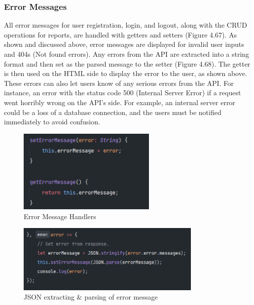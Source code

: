\subsubsection{Error Messages}
All error messages for user registration, login, and logout, along with the CRUD operations for reports, are handled with getters and setters (Figure 4.67). As shown and discussed above, error messages are displayed for invalid user inputs and 404s (Not found errors). Any errors from the API are extracted into a string format and then set as the parsed message to the setter (Figure 4.68). The getter is then used on the HTML side to display the error to the user, as shown above. These errors can also let users know of any serious errors from the API. For instance, an error with the status code 500 (Internal Server Error) if a request went horribly wrong on the API's side. For example, an internal server error could be a loss of a database connection, and the users must be notified immediately to avoid confusion.

\begin{figure}[H]
    \centering
    \caption{Error Message Handlers}
    \label{image:errorMessageHandlers}
    \includegraphics[width=0.6\textwidth]{images/repota/report_pages/error_handlers.png}
\end{figure}

\begin{figure}[H]
    \centering
    \caption{JSON extracting \& parsing of error message}
    \label{image:letError}
    \includegraphics[width=0.8\textwidth]{images/repota/report_pages/let_error.png}
\end{figure}

